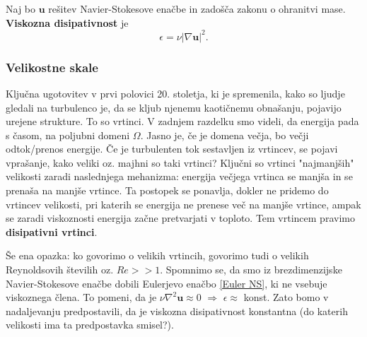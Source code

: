 \documentclass[mat2, tisk]{fmfdelo}
\newcommand{\bd}{\textbf}
\begin{document}
\begin{definicija}
Naj bo $\bd{u}$ rešitev Navier-Stokesove enačbe in zadošča zakonu o ohranitvi mase. \textbf{Viskozna disipativnost} je 
\begin{equation}
\epsilon = \nu|\nabla \bd{u}|^2.
\end{equation}
\end{definicija}

\subsubsection{Velikostne skale}
Ključna ugotovitev v prvi polovici 20. stoletja, ki je spremenila, kako so ljudje gledali 
na turbulenco je, da se kljub njenemu kaotičnemu obnašanju, pojavijo urejene strukture. To so vrtinci. V zadnjem razdelku smo videli, da energija pada s časom, na poljubni domeni 
$\Omega$. Jasno je, če je domena večja, bo večji odtok/prenos energije. Če je turbulenten 
tok sestavljen iz vrtincev, se pojavi vprašanje, kako veliki oz. majhni so taki vrtinci? 
Ključni so vrtinci "najmanjših" velikosti zaradi naslednjega mehanizma:
energija večjega vrtinca se manjša in se prenaša na manjše vrtince. Ta postopek se ponavlja, dokler 
ne pridemo do vrtincev velikosti, pri katerih se energija ne prenese več na manjše vrtince, 
ampak se zaradi viskoznosti energija začne pretvarjati v toploto. Tem vrtincem pravimo \textbf{disipativni vrtinci}.

Še ena opazka: ko govorimo o velikih vrtincih, govorimo tudi o velikih Reynoldsovih 
številih oz. $Re >> 1$. Spomnimo se, da smo iz brezdimenzijske Navier-Stokesove enačbe 
dobili Eulerjevo enačbo \ref{Euler NS}, ki ne vsebuje viskoznega člena. To pomeni, da je 
$\nu \nabla^2 \bd{u} \approx 0$ $\Longrightarrow$ $\epsilon \approx$ konst. Zato bomo v 
nadaljevanju predpostavili, da je viskozna disipativnost konstantna (do katerih velikosti ima ta predpostavka smisel?).\\
\end{document}
